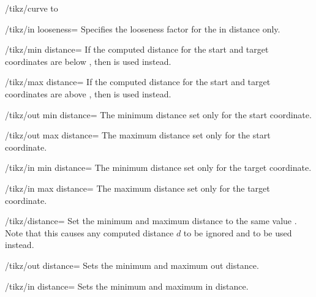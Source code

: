 \begin{key}{/tikz/curve to}
  \begin{key}{/tikz/in looseness=}
    Specifies the looseness factor for the in distance only.
  \end{key}
  \begin{key}{/tikz/min distance=}
    If the computed distance for the start and target coordinates are
    below , then  is used instead.
  \end{key}
  \begin{key}{/tikz/max distance=}
    If the computed distance for the start and target coordinates are
    above , then  is used instead.
  \end{key}
  \begin{key}{/tikz/out min distance=}
    The minimum distance set only for the start coordinate.
  \end{key}
  \begin{key}{/tikz/out max distance=}
    The maximum distance set only for the start coordinate.
  \end{key}
  \begin{key}{/tikz/in min distance=}
    The minimum distance set only for the target coordinate.
  \end{key}
  \begin{key}{/tikz/in max distance=}
    The maximum distance set only for the target coordinate.
  \end{key}
  \begin{key}{/tikz/distance=}
    Set the minimum and maximum distance to the same value . Note
    that this causes any computed distance $d$ to be ignored and
     to be used instead.
\begin{codeexample}[]
\end{codeexample}
  \end{key}
  \begin{key}{/tikz/out distance=}
    Sets the minimum and maximum out distance.
  \end{key}
  \begin{key}{/tikz/in distance=}
    Sets the minimum and maximum in distance.
  \end{key}

\end{key}

